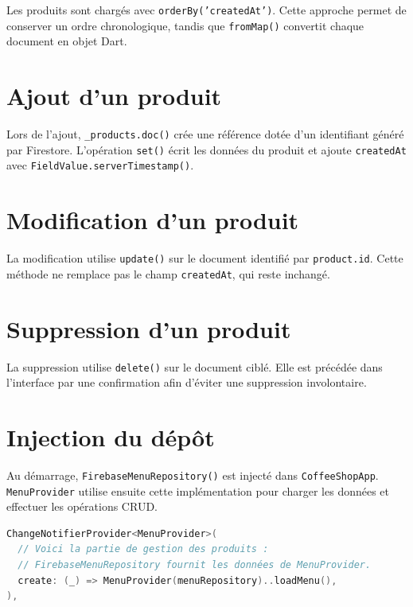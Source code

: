 \documentclass[12pt,a4paper]{report}
\begin{document}
Les produits sont chargés avec \texttt{orderBy('createdAt')}. Cette approche permet
de conserver un ordre chronologique, tandis que \texttt{fromMap()} convertit chaque
document en objet Dart.

\section{Ajout d'un produit}

Lors de l'ajout, \texttt{\_products.doc()} crée une référence dotée d'un identifiant
généré par Firestore. L'opération \texttt{set()} écrit les données du produit et
ajoute \texttt{createdAt} avec \texttt{FieldValue.serverTimestamp()}.

\section{Modification d'un produit}

La modification utilise \texttt{update()} sur le document identifié par
\texttt{product.id}. Cette méthode ne remplace pas le champ \texttt{createdAt},
qui reste inchangé.

\section{Suppression d'un produit}

La suppression utilise \texttt{delete()} sur le document ciblé. Elle est précédée
dans l'interface par une confirmation afin d'éviter une suppression involontaire.

\section{Injection du dépôt}

Au démarrage, \texttt{FirebaseMenuRepository()} est injecté dans
\texttt{CoffeeShopApp}. \texttt{MenuProvider} utilise ensuite cette implémentation
pour charger les données et effectuer les opérations CRUD.

\begin{lstlisting}[language=C,caption={Partie du gestionnaire des produits dans \texttt{main.dart}}]
ChangeNotifierProvider<MenuProvider>(
  // Voici la partie de gestion des produits :
  // FirebaseMenuRepository fournit les données de MenuProvider.
  create: (_) => MenuProvider(menuRepository)..loadMenu(),
),
\end{lstlisting}


\end{document}
